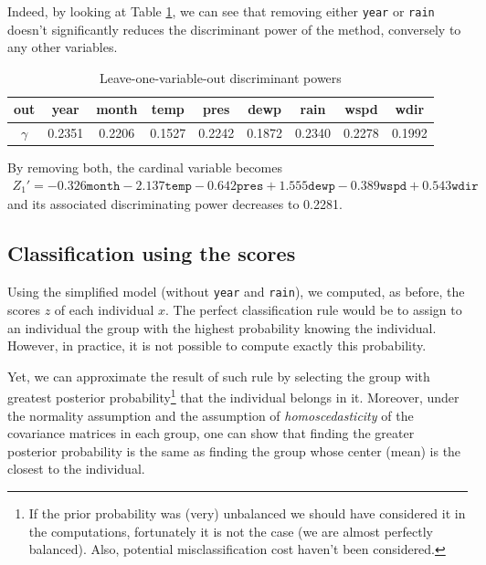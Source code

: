 \documentclass[a4paper, 12pt]{article}
\begin{document}
    Indeed, by looking at Table \ref{tab:leave_one_out_gamma}, we can see that removing either \texttt{year} or \texttt{rain} doesn't significantly reduces the discriminant power of the method, conversely to any other variables.
    
    \begin{table}[h]
	    \centering
	    \begin{tabular}{c|cccccccc}
	        out & year & month & temp & pres & dewp & rain & wspd & wdir \\
	        \hline
	        $\gamma$ & \num{0.2351} & \num{0.2206} & \num{0.1527} & \num{0.2242} & \num{0.1872} & \num{0.2340} & \num{0.2278} & \num{0.1992}
	    \end{tabular}
	    \caption{Leave-one-variable-out discriminant powers}
	    \label{tab:leave_one_out_gamma}
	\end{table}
    
    By removing both, the cardinal variable becomes 
    \begin{align*}
	    Z_1' = - \num{0.326} \texttt{month} - \num{2.137} \texttt{temp} - \num{0.642} \texttt{pres} + \num{1.555} \texttt{dewp} - \num{0.389} \texttt{wspd} + \num{0.543} \texttt{wdir}
	\end{align*}
	and its associated discriminating power decreases to \num{0.2281}.
	
	\subsection{Classification using the scores}
	
	Using the simplified model (without \texttt{year} and \texttt{rain}), we computed, as before, the scores $z$ of each individual $x$. The perfect classification rule would be to assign to an individual the group with the highest probability knowing the individual. However, in practice, it is not possible to compute exactly this probability.
	
	Yet, we can approximate the result of such rule by selecting the group with greatest posterior probability\footnote{If the prior probability was (very) unbalanced we should have considered it in the computations, fortunately it is not the case (we are almost perfectly balanced). Also, potential misclassification cost haven't been considered.} that the individual belongs in it. Moreover, under the normality assumption and the assumption of \emph{homoscedasticity} of the covariance matrices in each group, one can show that finding the greater posterior probability is the same as finding the group whose center (mean) is the closest to the individual.
	
\end{document}
